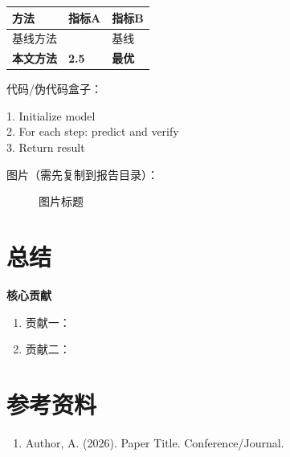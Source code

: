 \documentclass{ModernColorful}
\begin{document}
\begin{center}
\begin{tabular}{>{\raggedright}p{3cm} >{\centering}p{3cm} >{\centering\arraybackslash}p{3cm}}
  \toprule
  \tableheadercolor
  \textbf{方法} & \textbf{指标A} & \textbf{指标B} \\
  \midrule
  基线方法 & 1.0 & 基线 \\
  \rowcolor{bggreen}
  \textbf{本文方法} & \textbf{2.5} & \textbf{最优} \\
  \bottomrule
\end{tabular}
\end{center}

代码/伪代码盒子：

\begin{codebox}[算法伪代码]
  1. Initialize model\\
  2. For each step: predict and verify\\
  3. Return result
\end{codebox}

图片（需先复制到报告目录）：

\begin{figure}[H]
  \centering
  \caption{图片标题}
\end{figure}

\section{总结}

\begin{titlebox}
  \textbf{核心贡献}
  \begin{enumerate}
    \item 贡献一：
    \item 贡献二：
  \end{enumerate}
\end{titlebox}

\section{参考资料}

\begin{enumerate}
  \item Author, A. (2026). Paper Title. Conference/Journal.
\end{enumerate}
\end{document}
